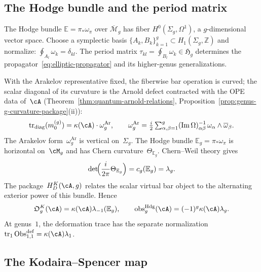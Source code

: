 \subsection{The Hodge bundle and the period matrix}
\label{subsec:hodge-curvature-origin}

The Hodge bundle $\mathbb{E} = \pi_*\omega_\pi$ over
$\overline{\mathcal{M}}_g$ has fiber
$H^0(\Sigma_g, \Omega^1)$, a $g$-dimensional vector space.
Choose a symplectic basis
$\{A_k, B_k\}_{k=1}^g \subset H_1(\Sigma_g, \mathbb{Z})$ and
normalize: $\oint_{A_l} \omega_k = \delta_{kl}$. The period matrix
$\tau_{kl} = \oint_{B_l} \omega_k \in \mathfrak{H}_g$ determines
the propagator~\eqref{eq:elliptic-propagator} and its higher-genus
generalizations.

With the Arakelov representative fixed, the fiberwise bar operation
is curved; the scalar diagonal of its curvature is the Arnold defect
contracted with the OPE data of~$\cA$
\textup{(}Theorem~\textup{\ref{thm:quantum-arnold-relations},}
Proposition~\textup{\ref{prop:genus-g-curvature-package}(ii))}:
\begin{equation}\label{eq:arnold-defect-hg}
\operatorname{tr}_{\mathrm{diag}}(m_0^{(g)})
= \kappa(\cA) \cdot \omega_g^{\mathrm{Ar}}, \qquad
\omega_g^{\mathrm{Ar}} = \tfrac{i}{2} \textstyle\sum_{\alpha,\beta=1}^g
(\operatorname{Im}\Omega)^{-1}_{\alpha\beta}\,
\omega_\alpha \wedge \overline{\omega}_\beta.
\end{equation}
The Arakelov form~$\omega_g^{\mathrm{Ar}}$ is vertical on~$\Sigma_g$.  The Hodge
bundle $\mathbb E_g=\pi_*\omega_\pi$ is horizontal on~$\cM_g$ and
has Chern curvature~$\Theta_{\mathbb E_g}$.  Chern--Weil theory gives
\[
 \det\!\Bigl(\frac{i}{2\pi}\Theta_{\mathbb E_g}\Bigr)
 =c_g(\mathbb E_g)=\lambda_g.
\]
The package~$H_D^K(\cA,g)$ relates the scalar virtual bar object to
the alternating exterior power of this bundle.  Hence
\[
 \mathfrak O_g^K(\cA)=\kappa(\cA)\lambda_{-1}(\mathbb E_g),
 \qquad
 \operatorname{obs}^{\mathrm{Hdg}}_g(\cA)
 =(-1)^g\kappa(\cA)\lambda_g.
\]
At genus~$1$, the deformation trace has the separate normalization
$\operatorname{tr}_1\operatorname{Obs}^{\mathrm{def}}_{1,1}
=\kappa(\cA)\lambda_1$.

\subsection{The Kodaira--Spencer map}
\label{subsec:ks-deformation-functor}


